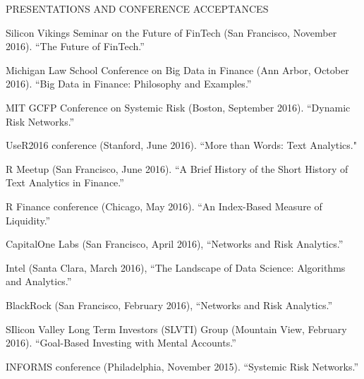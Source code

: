 \documentclass{article}
\begin{document}
\begin{description} 
\item[PRESENTATIONS AND CONFERENCE ACCEPTANCES] \mbox{}
\end{description}

\begin{etaremune}
\setlength\itemsep{-0.4em}

{\small


\item Silicon Vikings Seminar on the Future of FinTech (San Francisco, November 2016). ``The Future of FinTech.''

\item Michigan Law School Conference on Big Data in Finance (Ann Arbor, October 2016). ``Big Data in Finance: Philosophy and Examples.''

\item MIT GCFP Conference on Systemic Risk (Boston, September 2016). ``Dynamic Risk Networks.''

\item UseR2016 conference (Stanford, June 2016). ``More than Words: Text Analytics."

\item R Meetup (San Francisco, June 2016). ``A Brief History of the Short History of Text Analytics in Finance.''

\item R Finance conference (Chicago, May 2016). ``An Index-Based Measure of Liquidity.''

\item CapitalOne Labs (San Francisco, April 2016), ``Networks and Risk Analytics.''

\item Intel (Santa Clara, March 2016), ``The Landscape of Data Science: Algorithms and Analytics.''

\item BlackRock (San Francisco, February 2016), ``Networks and Risk Analytics.''

\item SIlicon Valley Long Term Investors (SLVTI) Group (Mountain View, February 2016). ``Goal-Based Investing with Mental Accounts.''


\item INFORMS conference (Philadelphia, November 2015). ``Systemic Risk Networks.''

}
\end{etaremune}
\end{document}
